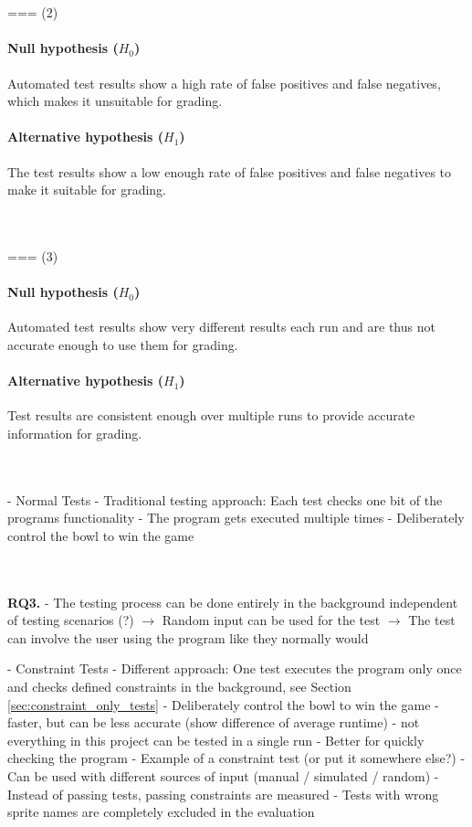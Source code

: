 ~\\~\\
=== (2)
\paragraph{Null hypothesis ($H_0$)}
Automated test results show a high rate of false positives and false negatives, which makes it unsuitable for grading.
\paragraph{Alternative hypothesis ($H_1$)}
The test results show a low enough rate of false positives and false negatives to make it suitable for grading.

~\\~\\
=== (3)
\paragraph{Null hypothesis ($H_0$)}
Automated test results show very different results each run and are thus not accurate enough to use them for grading.
\paragraph{Alternative hypothesis ($H_1$)}
Test results are consistent enough over multiple runs to provide accurate information for grading.

~\\~\\
- Normal Tests
    - Traditional testing approach: Each test checks one bit of the programs functionality
    - The program gets executed multiple times
    - Deliberately control the bowl to win the game

~\\~\\
\textbf{RQ3.}
- The testing process can be done entirely in the background independent of testing scenarios (?)
    $\rightarrow$ Random input can be used for the test
    $\rightarrow$ The test can involve the user using the program like they normally would

- Constraint Tests
    - Different approach: One test executes the program only once and checks defined constraints in the background, see Section \ref{sec:constraint_only_tests}
    - Deliberately control the bowl to win the game
    - faster, but can be less accurate (show difference of average runtime)
    - not everything in this project can be tested in a single run
    - Better for quickly checking the program
    - Example of a constraint test (or put it somewhere else?)
    - Can be used with different sources of input (manual / simulated / random)
    - Instead of passing tests, passing constraints are measured
    - Tests with wrong sprite names are completely excluded in the evaluation

